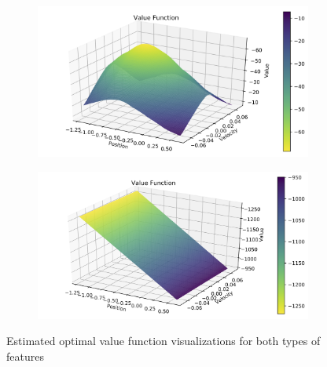 \documentclass[11pt]{article}
\numberwithin{equation}{section} %
\numberwithin{figure}{section} %
\numberwithin{table}{section} %
\begin{document}
\begin{figure}[H]
    \centering
    \begin{subfigure}{0.5\textwidth}
        \includegraphics[width=\linewidth]{figs/value_A.png}
        \caption{}
        \label{fig:value_a}
    \end{subfigure}%
    \begin{subfigure}{0.5\textwidth}
        \includegraphics[width=\linewidth]{figs/value_B.png}
        \caption{}
        \label{fig:value_b}
    \end{subfigure}
    \caption{Estimated optimal value function visualizations for both types of features}
    \label{fig:value}
\end{figure}
\end{document}
